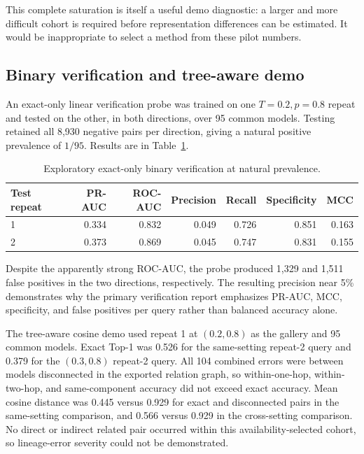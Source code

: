 \documentclass[11pt,a4paper]{article}
\begin{document}
This complete saturation is itself a useful demo diagnostic: a larger and more
difficult cohort is required before representation differences can be
estimated. It would be inappropriate to select a method from these pilot
numbers.

\subsection{Binary verification and tree-aware demo}

An exact-only linear verification probe was trained on one $T=0.2,p=0.8$
repeat and tested on the other, in both directions, over 95 common models.
Testing retained all 8,930 negative pairs per direction, giving a natural
positive prevalence of $1/95$. Results are in
Table~\ref{tab:demo-verification}.

\begin{table}[ht]
\centering
\caption{Exploratory exact-only binary verification at natural prevalence.}
\label{tab:demo-verification}
\begin{tabular}{lrrrrrr}
\toprule
Test repeat & PR-AUC & ROC-AUC & Precision & Recall & Specificity & MCC \\
\midrule
1 & 0.334 & 0.832 & 0.049 & 0.726 & 0.851 & 0.163 \\
2 & 0.373 & 0.869 & 0.045 & 0.747 & 0.831 & 0.155 \\
\bottomrule
\end{tabular}
\end{table}

Despite the apparently strong ROC-AUC, the probe produced 1,329 and 1,511
false positives in the two directions, respectively. The resulting precision
near 5\% demonstrates why the primary verification report emphasizes PR-AUC,
MCC, specificity, and false positives per query rather than balanced accuracy
alone.

The tree-aware cosine demo used repeat 1 at $(0.2,0.8)$ as the gallery and 95
common models. Exact Top-1 was 0.526 for the same-setting repeat-2 query and
0.379 for the $(0.3,0.8)$ repeat-2 query. All 104 combined errors were between
models disconnected in the exported relation graph, so within-one-hop,
within-two-hop, and same-component accuracy did not exceed exact accuracy.
Mean cosine distance was 0.445 versus 0.929 for exact and disconnected pairs
in the same-setting comparison, and 0.566 versus 0.929 in the cross-setting
comparison. No direct or indirect related pair occurred within this
availability-selected cohort, so lineage-error severity could not be
demonstrated.
\end{document}
